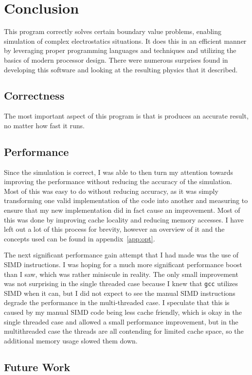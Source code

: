 \section{Conclusion}

This program correctly solves certain boundary value problems, enabling simulation
of complex electrostatics situations. It does this in an efficient manner by leveraging
proper programming languages and techniques and utilizing the basics of modern processor
design. There were numerous surprises found in developing this software and looking at
the resulting physics that it described.

\subsection{Correctness}

The most important aspect of this program is that is produces an accurate result, no
matter how fast it runs.


\subsection{Performance}

Since the simulation is correct, I was able to then turn my attention towards improving
the performance without reducing the accuracy of the simulation. Most of this was easy to
do without reducing accuracy, as it was simply transforming one valid implementation of
the code into another and measuring to ensure that my new implementation did in fact
cause an improvement. Most of this was done by improving cache locality and reducing
memory accesses. I have left out a lot of this process for brevity, however an overview
of it and the concepts used can be found in appendix~\ref{app:opt}.

The next significant performance gain attempt that I had made was the use of SIMD instructions.
I was hoping for a much more significant performance boost than I saw, which was rather
miniscule in reality. The only small improvement was not surprising in the single threaded
case because I knew that \texttt{gcc} utilizes SIMD when it can, but I did not expect to see
the manual SIMD instructions degrade the performance in the multi-threaded case. I speculate
that this is caused by my manual SIMD code being less cache friendly, which is okay in the
single threaded case and allowed a small performance improvement, but in the multithreaded case
the threads are all contending for limited cache space, so the additional memory usage slowed
them down.

\subsection{Future Work}

